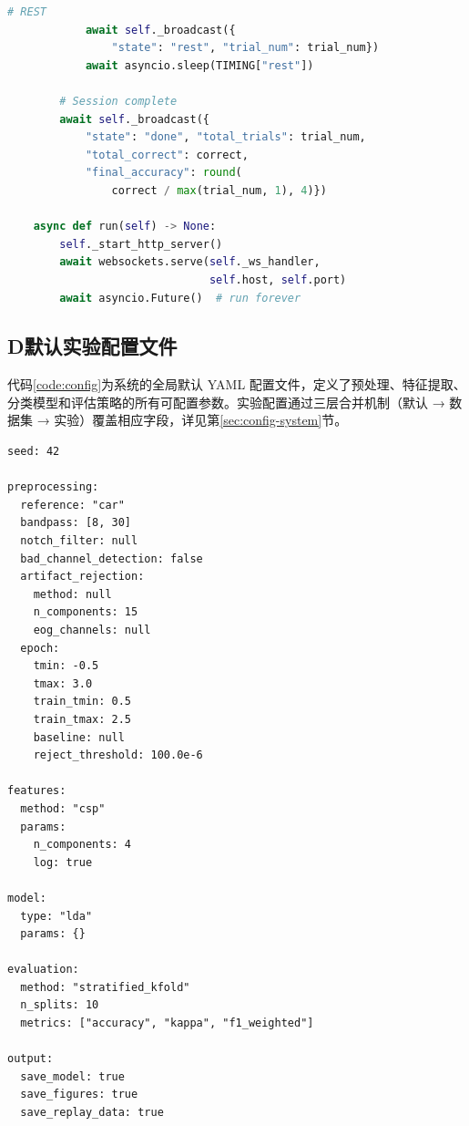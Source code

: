 \begin{lstlisting}[language=Python, caption={在线仿真服务端 \texttt{src/online/server.py}\label{code:server}}]
            # REST
            await self._broadcast({
                "state": "rest", "trial_num": trial_num})
            await asyncio.sleep(TIMING["rest"])

        # Session complete
        await self._broadcast({
            "state": "done", "total_trials": trial_num,
            "total_correct": correct,
            "final_accuracy": round(
                correct / max(trial_num, 1), 4)})

    async def run(self) -> None:
        self._start_http_server()
        await websockets.serve(self._ws_handler,
                               self.host, self.port)
        await asyncio.Future()  # run forever
\end{lstlisting}

\subsection*{D\quad 默认实验配置文件}

代码\ref{code:config}为系统的全局默认 YAML 配置文件，定义了预处理、特征提取、分类模型和评估策略的所有可配置参数。实验配置通过三层合并机制（默认 → 数据集 → 实验）覆盖相应字段，详见第\ref{sec:config-system}节。

\begin{lstlisting}[caption={全局默认配置 \texttt{configs/default.yaml}\label{code:config}}]
seed: 42

preprocessing:
  reference: "car"
  bandpass: [8, 30]
  notch_filter: null
  bad_channel_detection: false
  artifact_rejection:
    method: null
    n_components: 15
    eog_channels: null
  epoch:
    tmin: -0.5
    tmax: 3.0
    train_tmin: 0.5
    train_tmax: 2.5
    baseline: null
    reject_threshold: 100.0e-6

features:
  method: "csp"
  params:
    n_components: 4
    log: true

model:
  type: "lda"
  params: {}

evaluation:
  method: "stratified_kfold"
  n_splits: 10
  metrics: ["accuracy", "kappa", "f1_weighted"]

output:
  save_model: true
  save_figures: true
  save_replay_data: true
\end{lstlisting}


\label{appendix}  %
